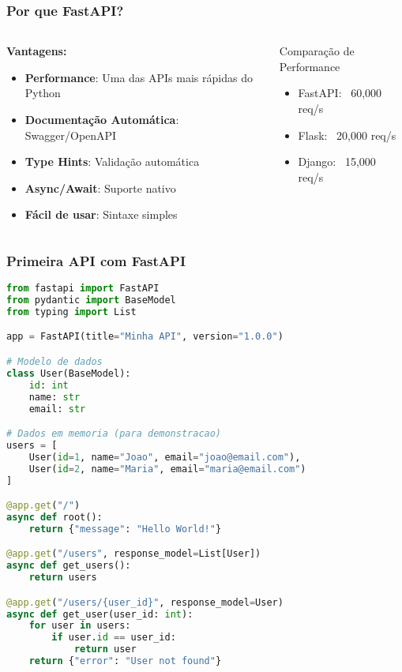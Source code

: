 \documentclass[aspectratio=169]{beamer}
\begin{document}
\begin{frame}
    \frametitle{Por que FastAPI?}
    \begin{columns}
        \begin{column}{0.5\textwidth}
            \textbf{Vantagens:}
            \begin{itemize}
                \item \textbf{Performance}: Uma das APIs mais rápidas do Python
                \item \textbf{Documentação Automática}: Swagger/OpenAPI
                \item \textbf{Type Hints}: Validação automática
                \item \textbf{Async/Await}: Suporte nativo
                \item \textbf{Fácil de usar}: Sintaxe simples
            \end{itemize}
        \end{column}
        \begin{column}{0.5\textwidth}
            \begin{alertblock}{Comparação de Performance}
                \begin{itemize}
                    \item FastAPI: ~60,000 req/s
                    \item Flask: ~20,000 req/s
                    \item Django: ~15,000 req/s
                \end{itemize}
            \end{alertblock}
        \end{column}
    \end{columns}
\end{frame}

\begin{frame}[fragile]
    \frametitle{Primeira API com FastAPI}
    \begin{lstlisting}[language=Python]
from fastapi import FastAPI
from pydantic import BaseModel
from typing import List

app = FastAPI(title="Minha API", version="1.0.0")

# Modelo de dados
class User(BaseModel):
    id: int
    name: str
    email: str

# Dados em memoria (para demonstracao)
users = [
    User(id=1, name="Joao", email="joao@email.com"),
    User(id=2, name="Maria", email="maria@email.com")
]

@app.get("/")
async def root():
    return {"message": "Hello World!"}

@app.get("/users", response_model=List[User])
async def get_users():
    return users

@app.get("/users/{user_id}", response_model=User)
async def get_user(user_id: int):
    for user in users:
        if user.id == user_id:
            return user
    return {"error": "User not found"}
    \end{lstlisting}
\end{frame}
\end{document}

